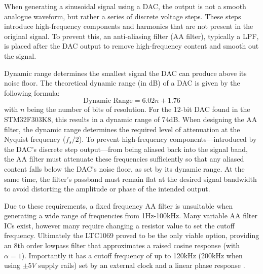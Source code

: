 When generating a sinusoidal signal using a \ac{DAC}, the output is not a smooth analogue waveform, but rather a series of discrete voltage steps. These steps introduce high-frequency components and harmonics that are not present in the original signal.  To prevent this, an anti-aliasing filter (AA filter), typically a \ac{LPF}, is placed after the DAC output to remove high-frequency content and smooth out the signal.

Dynamic range determines the smallest signal the DAC can produce above its noise floor. The theoretical dynamic range (in dB) of a DAC is given by the following formula\cite{gaddyDYNAMICPERFORMANCETESTING}:
\begin{equation}
    \text{Dynamic Range}=6.02n + 1.76 
    \label{eq:dac_range}
\end{equation}
with $n$ being the number of bits of resolution. For the 12-bit \ac{DAC} found in the STM32F303K8, this results in a dynamic range of 74dB. When designing the AA filter, the dynamic range determines the required level of attenuation at the Nyquist frequency ($f_s/2$). To prevent high-frequency components—introduced by the DAC's discrete step output—from being aliased back into the signal band, the AA filter must attenuate these frequencies sufficiently so that any aliased content falls below the DAC's noise floor, as set by its dynamic range. At the same time, the filter's passband must remain flat at the desired signal bandwidth to avoid distorting the amplitude or phase of the intended output. 


Due to these requirements, a fixed frequency AA filter is unsuitable when generating a wide range of frequencies from 1Hz-100kHz. Many variable AA filter ICs exist, however many require changing a resistor value to set the cutoff frequency.  Ultimately the LTC1069 proved to be the only viable option, providing an 8th order lowpass filter that approximates a raised cosine response (with $\alpha=1$). Importantly it has a cutoff frequency of up to 120kHz (200kHz when using $\pm5V$ supply rails) set by an external clock and a linear phase response \cite{LTC10697CS8PBF}. 

